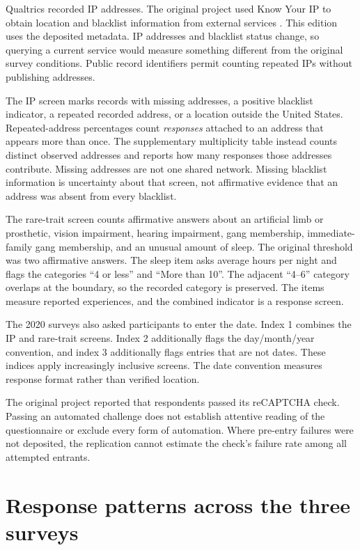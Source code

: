\documentclass[11pt]{article}
\begin{document}
Qualtrics recorded IP addresses. The original project used Know Your IP to obtain location and blacklist information from external services \citep{kyip}. This edition uses the deposited metadata. IP addresses and blacklist status change, so querying a current service would measure something different from the original survey conditions. Public record identifiers permit counting repeated IPs without publishing addresses.

The IP screen marks records with missing addresses, a positive blacklist indicator, a repeated recorded address, or a location outside the United States. Repeated-address percentages count \emph{responses} attached to an address that appears more than once. The supplementary multiplicity table instead counts distinct observed addresses and reports how many responses those addresses contribute. Missing addresses are not one shared network. Missing blacklist information is uncertainty about that screen, not affirmative evidence that an address was absent from every blacklist.

The rare-trait screen counts affirmative answers about an artificial limb or prosthetic, vision impairment, hearing impairment, gang membership, immediate-family gang membership, and an unusual amount of sleep. The original threshold was two affirmative answers. The sleep item asks average hours per night and flags the categories ``4 or less'' and ``More than 10''. The adjacent ``4--6'' category overlaps at the boundary, so the recorded category is preserved. The items measure reported experiences, and the combined indicator is a response screen.

The 2020 surveys also asked participants to enter the date. Index 1 combines the IP and rare-trait screens. Index 2 additionally flags the day/month/year convention, and index 3 additionally flags entries that are not dates. These indices apply increasingly inclusive screens. The date convention measures response format rather than verified location.

The original project reported that respondents passed its reCAPTCHA check. Passing an automated challenge does not establish attentive reading of the questionnaire or exclude every form of automation. Where pre-entry failures were not deposited, the replication cannot estimate the check's failure rate among all attempted entrants.

\section{Response patterns across the three surveys}
\end{document}
